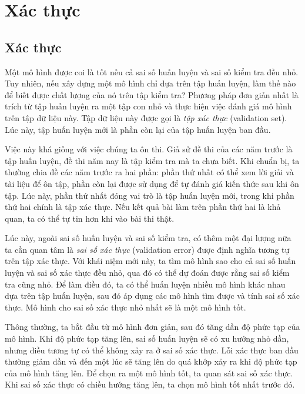 \section{Xác thực}
\subsection{Xác thực}

Một mô hình được coi là tốt nếu cả sai số huấn luyện và sai số kiểm tra đều nhỏ. Tuy
nhiên, nếu xây dựng một mô hình {chỉ} dựa trên tập huấn luyện, làm thế nào để
biết được chất lượng của nó trên tập kiểm tra?
Phương pháp đơn giản nhất là {trích} từ tập huấn luyện ra một tập con nhỏ và
thực hiện việc đánh giá mô hình trên tập dữ liệu này. Tập dữ liệu này được gọi
là \textit{tập xác thực} ({validation set}). Lúc này, {tập huấn luyện mới
là phần còn lại của tập huấn luyện ban đầu}.

Việc này khá giống với việc chúng ta ôn thi. Giả sử đề thi của các năm trước là
tập huấn luyện, đề thi năm nay là tập kiểm tra mà ta chưa biết. Khi chuẩn bị,
ta thường chia đề các năm trước ra hai phần: phần thứ nhất có thể xem lời giải
và tài liệu để ôn tập, phần còn lại được sử dụng để tự đánh giá kiến thức sau
khi ôn tập. Lúc này, phần thứ nhất đóng vai trò là tập huấn luyện mới, trong khi
phần thứ hai chính là tập xác thực. Nếu kết quả bài làm trên phần thứ hai là
khả quan, ta có thể tự tin hơn khi vào bài thi thật.




Lúc này, ngoài sai số huấn luyện và sai số kiểm tra, có thêm một đại lượng nữa ta cần
quan tâm là \textit{sai số xác thực} (validation error) được định nghĩa tương tự trên tập xác thực.
Với khái niệm mới này, ta tìm mô hình sao cho cả {sai số huấn luyện} và {sai số xác thực}
đều nhỏ, qua đó có thể dự đoán được rằng {sai số kiểm tra} cũng nhỏ. Để làm điều
đó, ta có thể huấn luyện nhiều mô hình khác nhau dựa trên tập huấn luyện, sau đó
áp dụng các mô hình tìm được và tính {sai số xác thực}. Mô hình cho {sai số xác thực}
nhỏ nhất sẽ là một mô hình tốt.

Thông thường, ta bắt đầu từ mô hình đơn giản, sau đó tăng dần độ phức tạp của mô
hình. Khi độ phức tạp tăng lên, sai số huấn luyện sẽ có xu hướng nhỏ dần, nhưng
điều tương tự có thể không xảy ra ở sai số xác thực. Lỗi xác thực ban đầu
thường giảm dần và đến một lúc sẽ tăng lên do quá khớp xảy ra khi độ phức tạp của mô hình tăng lên. Để chọn ra một mô hình tốt, ta quan
sát sai số xác thực. Khi {sai số xác thực} có chiều hướng tăng lên, ta chọn mô hình tốt nhất trước đó.



